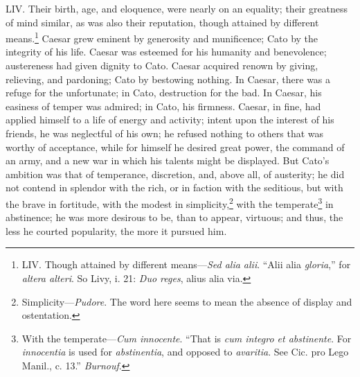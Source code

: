 LIV. Their birth, age, and eloquence, were nearly on an equality;
their greatness of mind similar, as was also their reputation, though
attained by different means.\footnote{LIV. Though attained by different means—\emph{Sed alia alii}.
``Alii alia \emph{gloria},'' for \emph{altera alteri}. So Livy, i. 21: \emph{Duo
reges}, alius alia via.} Caesar grew eminent by generosity
and munificence; Cato by the integrity of his life. Caesar was
esteemed for his humanity and benevolence; austereness had given
dignity to Cato. Caesar acquired renown by giving, relieving, and
pardoning; Cato by bestowing nothing. In Caesar, there was a refuge
for the unfortunate; in Cato, destruction for the bad. In Caesar, his
easiness of temper was admired; in Cato, his firmness. Caesar, in
fine, had applied himself to a life of energy and activity; intent
upon the interest of his friends, he was neglectful of his own; he
refused nothing to others that was worthy of acceptance, while for
himself he desired great power, the command of an army, and a new war
in which his talents might be displayed. But Cato's ambition was that
of temperance, discretion, and, above all, of austerity; he did not
contend in splendor with the rich, or in faction with the seditious,
but with the brave in fortitude, with the modest in simplicity,\footnote{Simplicity—\emph{Pudore}. The word here seems to mean the absence
of display and ostentation.}
with the temperate\footnote{With the temperate—\emph{Cum innocente}. ``That is \emph{cum integro
et abstinente}. For \emph{innocentia} is used for \emph{abstinentia}, and
opposed to \emph{avaritia}. See Cic. pro Lego Manil., c. 13.'' \emph{Burnouf}.} in abstinence; he was more desirous to be,
than to appear, virtuous; and thus, the less he courted popularity,
the more it pursued him.

